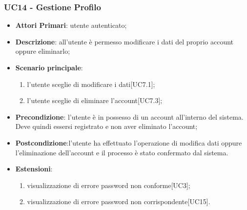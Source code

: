 \subsubsection{UC14 - Gestione Profilo}
\begin{itemize}
	\item \textbf{Attori Primari}: utente autenticato;
	\item \textbf{Descrizione}: all'utente è permesso modificare i dati del proprio account oppure eliminarlo;
	\item \textbf{Scenario principale}: 
	\begin{enumerate}[label=\alph*.]
		\item l'utente sceglie di modificare i dati[UC7.1];
		\item l'utente sceglie di eliminare l'account[UC7.3];
	\end{enumerate}
	
	\item \textbf{Precondizione}: l'utente è in possesso di un account all'interno del sistema. Deve quindi essersi registrato e non aver eliminato l'account;
	\item \textbf{Postcondizione}:l'utente ha effettuato l'operazione di modifica dati oppure l'eliminazione dell'account e il processo è stato confermato dal sistema.
	\item \textbf{Estensioni}:
	\begin{enumerate}
	\item visualizzazione di errore password non conforme[UC3];
	\item visualizzazione di errore password non corrispondente[UC15].
	\end{enumerate}
\end{itemize} 

